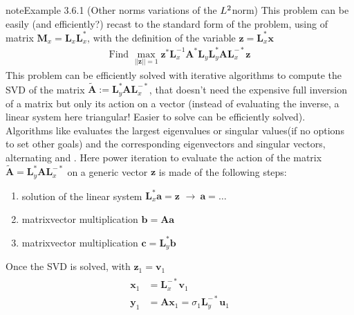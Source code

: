 \documentclass[letterpaper,10pt,english]{jupyterBook}
\begin{document}
\begin{sphinxadmonition}{note}{Example 3.6.1 (Other norms \sphinxhyphen{} variations of the \protect\(L^2\protect\)\sphinxhyphen{}norm)}
\sphinxAtStartPar
This problem can be easily (and efficiently?) recast to the standard form of the problem, using {\hyperref[\detokenize{ch/linear-algebra/matrix-factorization:math-matrix-factorization}]{}} of matrix \(\mathbf{M}_x = \mathbf{L}_x \mathbf{L}_x^*\), with the definition of the variable \(\mathbf{z} = \mathbf{L}_x^* \mathbf{x}\)
\begin{equation*}
\begin{split}\text{Find } \max_{||\mathbf{z}||=1} \mathbf{z}^* \mathbf{L}_x^{-1} \mathbf{A}^* \mathbf{L}_y \mathbf{L}_y^* \mathbf{A} \mathbf{L}_x^{-*} \mathbf{z} \end{split}
\end{equation*}
\sphinxAtStartPar
This problem can be efficiently solved with iterative algorithms to compute the SVD of the matrix \(\widetilde{\mathbf{A}} := \mathbf{L}_y^* \mathbf{A} \mathbf{L}_x^{-*}\), that doesn’t need the expensive full inversion of a matrix but only its action on a vector (instead of evaluating the inverse, a linear system \sphinxhyphen{} here triangular! Easier to solve \sphinxhyphen{} can be efficiently solved). Algorithms like  evaluates the largest eigenvalues or singular values(if no options to set other goals) and the corresponding eigenvectors and singular vectors, alternating  and . Here power iteration to evaluate the action of the matrix \(\widetilde{\mathbf{A}} = \mathbf{L}_y^* \mathbf{A}\mathbf{L}_x^{-*}\) on a generic vector \(\mathbf{z}\) is made of the following steps:
\begin{enumerate}
%
\item {} 
\sphinxAtStartPar
solution of the linear system \(\mathbf{L}^*_x \mathbf{a} = \mathbf{z}\) \(\rightarrow \ \mathbf{a} = \dots\)

\item {} 
\sphinxAtStartPar
matrix\sphinxhyphen{}vector multiplication \(\mathbf{b} = \mathbf{A} \mathbf{a}\)

\item {} 
\sphinxAtStartPar
matrix\sphinxhyphen{}vector multiplication \(\mathbf{c} = \mathbf{L}^*_y \mathbf{b}\)

\end{enumerate}

\sphinxAtStartPar
Once the SVD is solved, with \(\mathbf{z}_1 = \mathbf{v}_1\)
\begin{equation*}
\begin{split}\begin{aligned}
  \mathbf{x}_1 & = \mathbf{L}_x^{-*} \mathbf{v}_1 \\
  \mathbf{y}_1 & = \mathbf{A} \mathbf{x}_1 = \sigma_1 \mathbf{L}_y^{-*} \mathbf{u}_1 \\
\end{aligned}\end{split}
\end{equation*}\end{sphinxadmonition}
\end{document}
